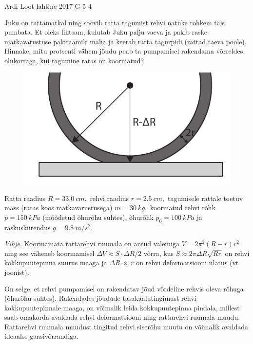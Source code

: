{Ardi Loot} %
{lahtine} %
{2017} %
{G 5} %
{4} %
{
\ifStatement
Juku on rattamatkal ning soovib ratta tagumist rehvi natuke rohkem
täis pumbata. Et oleks lihtsam, kulutab Juku palju vaeva ja pakib
raske matkavarustuse pakiraamilt maha ja keerab ratta tagurpidi (rattad
taeva poole). Hinnake, mitu protsenti vähem jõudu peab ta pumpamisel
rakendama võrreldes olukorraga, kui tagumine ratas on koormatud?

\begin{figure}
	\vspace{-15pt}
	\includegraphics[width=\linewidth]{2017-lahg-05-fig_rattakumm.pdf}
\end{figure}

Ratta raadius $R=\SI{33.0}{cm},$ rehvi raadius $r=\SI{2.5}{cm},$
tagumisele rattale toetuv mass (ratas koos matkavarustusega) $m=\SI{30}{kg},$
koormatud rehvi rõhk $p=\SI{150}{kPa}$ (mõõdetud õhurõhu suhtes), õhurõhk $p_{0}=\SI{100}{kPa}$
ja raskuskiirendus $g=\SI{9.8}{m/s^{2}}.$ 

\textit{Vihje}. Koormamata rattarehvi ruumala on antud valemiga $V=2\pi^{2}\left(R-r\right)r^{2}$
ning see väheneb koormamisel $\Delta V\approx S\cdot\Delta R/2$ võrra,
kus $S\approx2\pi\Delta R\sqrt{Rr}$ on rehvi kokkupuutepinna suurus
maaga ja $\Delta R\ll r$ on rehvi deformatsiooni ulatus (vt joonist).
\fi


\ifHint
On selge, et rehvi pumpamisel on rakendatav jõud võrdeline rehvis oleva rõhuga (õhurõhu suhtes). Rakendades jõudude tasakaalutingimust rehvi kokkupuutepinnale maaga, on võimalik leida kokkupuutepinna pindala, millest saab omakorda avaldada rehvi deformatsiooni ning rattarehvi ruumala muudu. Rattarehvi ruumala muudust tingitud rehvi siserõhu muutu on võimalik avaldada ideaalse gaasivõrrandiga.
\fi


}
